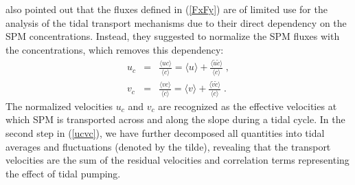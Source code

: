 \cite{schulzumlauf2016} also pointed out that the fluxes defined in
(\ref{FxFy}) are of limited use for the analysis of the tidal
transport mechanisms due to their direct dependency on the SPM
concentrations. Instead, they suggested to normalize the SPM fluxes
with the concentrations, which removes this dependency:
\begin{equation}
 \label{ucvc}
 \begin{array}{rcl}
 u_c &=& \displaystyle 
            \frac{\langle u c \rangle}{\langle c \rangle} 
         =  \langle u \rangle + \frac{\langle \tilde{u} \tilde{c} 
\rangle}{\langle c \rangle} \; , \\[5mm]
 v_c &=& \displaystyle
           \frac{\langle v c \rangle}{\langle c \rangle} 
         =  \langle v \rangle + \frac{\langle \tilde{v} \tilde{c} 
\rangle}{\langle c \rangle} \; .
 \end{array}
\end{equation}
The normalized velocities $u_c$ and $v_c$ are recognized as the
effective velocities at which SPM is transported across and along the
slope during a tidal cycle. In the second step in (\ref{ucvc}), we
have further decomposed all quantities into tidal averages and
fluctuations (denoted by the tilde), revealing that the transport
velocities are the sum of the residual velocities and correlation
terms representing the effect of tidal pumping.

